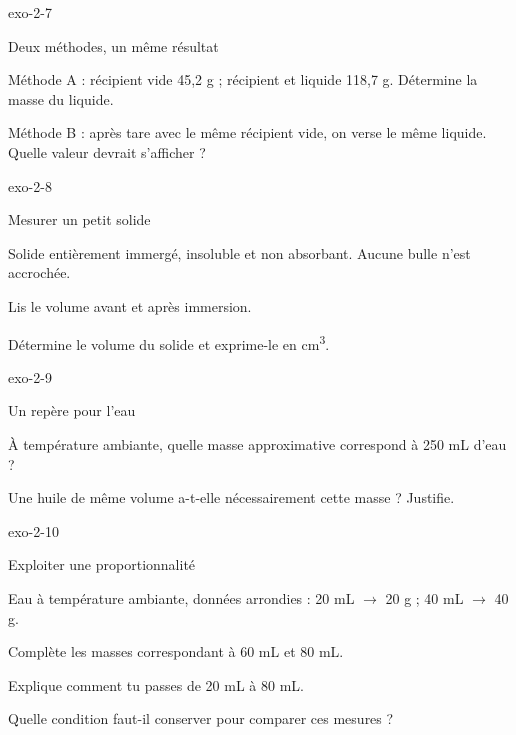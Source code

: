 \documentclass[12pt,twoside,openany]{book}
\begin{document}
\begin{blocLivre}{exo-2-7}
\begin{exercice}[2]{Deux méthodes, un même résultat}
\begin{questions}
\item Méthode A : récipient vide 45,2 g ; récipient et liquide 118,7 g. Détermine la masse du liquide.
\item Méthode B : après tare avec le même récipient vide, on verse le même liquide. Quelle valeur devrait s’afficher ?
\end{questions}
\end{exercice}\end{blocLivre}
\begin{blocLivre}{exo-2-8}
\begin{exercice}[2]{Mesurer un petit solide}
\begin{donnees}Solide entièrement immergé, insoluble et non absorbant. Aucune bulle n’est accrochée.\par
\end{donnees}
\begin{questions}
\item Lis le volume avant et après immersion.
\item Détermine le volume du solide et exprime-le en cm\textsuperscript{3}.
\end{questions}
\end{exercice}\end{blocLivre}
\begin{blocLivre}{exo-2-9}
\begin{exercice}[2]{Un repère pour l’eau}
\begin{questions}
\item À température ambiante, quelle masse approximative correspond à 250 mL d’eau ?
\item Une huile de même volume a-t-elle nécessairement cette masse ? Justifie.
\end{questions}
\end{exercice}\end{blocLivre}
\begin{blocLivre}{exo-2-10}
\begin{exercice}[2]{Exploiter une proportionnalité}
\begin{donnees}Eau à température ambiante, données arrondies : 20 mL \(\rightarrow\) 20 g ; 40 mL \(\rightarrow\) 40 g.\par
\end{donnees}
\begin{questions}
\item Complète les masses correspondant à 60 mL et 80 mL.
\item Explique comment tu passes de 20 mL à 80 mL.
\item Quelle condition faut-il conserver pour comparer ces mesures ?
\end{questions}
\end{exercice}\end{blocLivre}
\end{document}

